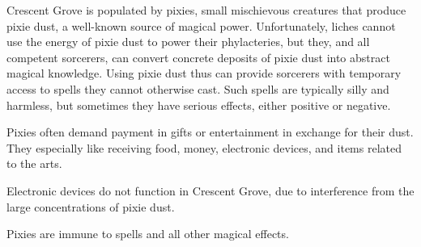 \documentclass[blue]{Sel}
\begin{document}
Crescent Grove is populated by pixies, small mischievous creatures that produce pixie dust, a well-known source of magical power. Unfortunately, liches cannot use the energy of pixie dust to power their phylacteries, but they, and all competent sorcerers, can convert concrete deposits of pixie dust into abstract magical knowledge. Using pixie dust thus can provide sorcerers with temporary access to spells they cannot otherwise cast. Such spells are typically silly and harmless, but sometimes they have serious effects, either positive or negative.

Pixies often demand payment in gifts or entertainment in exchange for their dust. They especially like receiving food, money, electronic devices, and items related to the arts.

Electronic devices do not function in Crescent Grove, due to interference from the large concentrations of pixie dust.

Pixies are immune to spells and all other magical effects.
\end{document}
